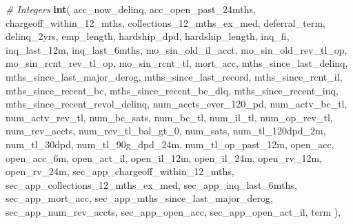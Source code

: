 \documentclass[11pt,]{report}
\newenvironment{Shaded}{\begin{snugshade}}{\end{snugshade}}
\newcommand{\CommentTok}[1]{\textcolor[rgb]{0.56,0.35,0.01}{\textit{#1}}}
\newcommand{\DecValTok}[1]{\textcolor[rgb]{0.00,0.00,0.81}{#1}}
\newcommand{\KeywordTok}[1]{\textcolor[rgb]{0.13,0.29,0.53}{\textbf{#1}}}
\newcommand{\NormalTok}[1]{#1}
\begin{document}
\begin{Shaded}
\begin{Highlighting}[numbers=left,,]
{{{      \CommentTok{# Integers}
      \KeywordTok{int}\NormalTok{(}
\NormalTok{        acc_now_delinq,}
\NormalTok{        acc_open_past_24mths,}
\NormalTok{        chargeoff_within_}\DecValTok{12}\NormalTok{_mths,}
\NormalTok{        collections_}\DecValTok{12}\NormalTok{_mths_ex_med,}
\NormalTok{        deferral_term,}
\NormalTok{        delinq_2yrs,}
\NormalTok{        emp_length,}
\NormalTok{        hardship_dpd,}
\NormalTok{        hardship_length,}
\NormalTok{        inq_fi,}
\NormalTok{        inq_last_12m,}
\NormalTok{        inq_last_6mths,}
\NormalTok{        mo_sin_old_il_acct,}
\NormalTok{        mo_sin_old_rev_tl_op,}
\NormalTok{        mo_sin_rcnt_rev_tl_op,}
\NormalTok{        mo_sin_rcnt_tl,}
\NormalTok{        mort_acc,}
\NormalTok{        mths_since_last_delinq,}
\NormalTok{        mths_since_last_major_derog,}
\NormalTok{        mths_since_last_record,}
\NormalTok{        mths_since_rcnt_il,}
\NormalTok{        mths_since_recent_bc,}
\NormalTok{        mths_since_recent_bc_dlq,}
\NormalTok{        mths_since_recent_inq,}
\NormalTok{        mths_since_recent_revol_delinq,}
\NormalTok{        num_accts_ever_}\DecValTok{120}\NormalTok{_pd,}
\NormalTok{        num_actv_bc_tl,}
\NormalTok{        num_actv_rev_tl,}
\NormalTok{        num_bc_sats,}
\NormalTok{        num_bc_tl,}
\NormalTok{        num_il_tl,}
\NormalTok{        num_op_rev_tl,}
\NormalTok{        num_rev_accts,}
\NormalTok{        num_rev_tl_bal_gt_}\DecValTok{0}\NormalTok{,}
\NormalTok{        num_sats,}
\NormalTok{        num_tl_120dpd_2m,}
\NormalTok{        num_tl_30dpd,}
\NormalTok{        num_tl_90g_dpd_24m,}
\NormalTok{        num_tl_op_past_12m,}
\NormalTok{        open_acc,}
\NormalTok{        open_acc_6m,}
\NormalTok{        open_act_il,}
\NormalTok{        open_il_12m,}
\NormalTok{        open_il_24m,}
\NormalTok{        open_rv_12m,}
\NormalTok{        open_rv_24m,}
\NormalTok{        sec_app_chargeoff_within_}\DecValTok{12}\NormalTok{_mths,}
\NormalTok{        sec_app_collections_}\DecValTok{12}\NormalTok{_mths_ex_med,}
\NormalTok{        sec_app_inq_last_6mths,}
\NormalTok{        sec_app_mort_acc,}
\NormalTok{        sec_app_mths_since_last_major_derog,}
\NormalTok{        sec_app_num_rev_accts,}
\NormalTok{        sec_app_open_acc,}
\NormalTok{        sec_app_open_act_il,}
\NormalTok{        term}
\NormalTok{      ),}
      
}}}
\end{Highlighting}
\end{Shaded}
\end{document}
